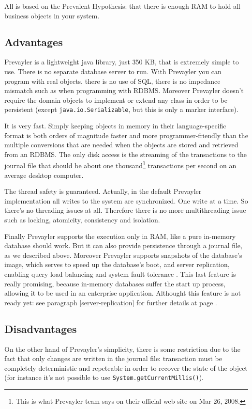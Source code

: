 		All is based on the Prevalent Hypothesis: that there is enough RAM to hold all business objects in your system. 	
		
			\subsection{Advantages}
			Prevayler is a lightweight java library, just 350 KB, that is extremely simple to use. There is no separate 
			database server to run. With Prevayler you can program with real objects, there is no use of SQL, there is 
			no impedance mismatch such as when programming with RDBMS. Moreover Prevayler doesn't require the 
			domain objects to implement or extend any class in order to be persistent (except \lstinline!java.io.Serializable!, but 
			this is only a marker interface).
			
			It is very fast. Simply keeping objects in memory in their language-specific format is both orders of magnitude 
			faster and more programmer-friendly than the multiple conversions that are needed when the objects are stored 
			and retrieved from an RDBMS. The only disk access is the streaming of the transactions to the journal file that 
			should be about one thousand\footnote{This is what Prevayler team says on their official web site on 
			Mar 26, 2008.} transactions per second on an average desktop computer.
			
			The thread safety is guaranteed. Actually, in the default Prevayler implementation all writes to the 
			system are synchronized. One write at a time. So there's no threading issues at all. Therefore 
			there is no more multithreading issue such as locking, atomicity, consistency and isolation.
			
			Finally Prevayler supports the execution only in RAM, like a pure in-memory database should work. But 
			it can also provide persistence through a journal file, as we described above. Moreover Prevayler 
			supports snapshots of the database's image, which serves to speed up the database's boot, 
			and server replication, enabling query load-balancing and 
			system fault-tolerance \cite{Prevayler}. This last feature is really promising, 
			because in-memory databases suffer the start up 
			process, allowing it to be used in an enterprise application. Althought this feature is not ready yet: 
			see paragraph \ref{server-replication} for further details at page \pageref{server-replication}.
    			
			\subsection{Disadvantages}
			On the other hand of Prevayler's simplicity, there is some restriction due to the fact that only changes 
			are written in the journal file: transaction must be completely deterministic and repeteable in order 
			to recover the state of the object (for instance it's not possible to use \lstinline!System.getCurrentMillis()!).
			
